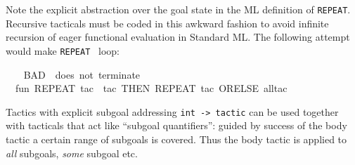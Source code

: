 \begin{isabellebody}
\begin{isamarkuptext}
  \begin{warn}
  Note the explicit abstraction over the goal state in the ML
  definition of \verb|REPEAT|.  Recursive tacticals must be coded in
  this awkward fashion to avoid infinite recursion of eager functional
  evaluation in Standard ML.  The following attempt would make \verb|REPEAT|~ loop:
  \end{warn}%
\end{isamarkuptext}%
\isamarkuptrue%
%
\isadelimML
%
\endisadelimML
%
\isatagML
{}\isamarkupfalse%
\ {}\isanewline
\ \ {}{}BAD\ {}{}\ does\ not\ terminate{}{}{}\isanewline
\ \ fun\ REPEAT\ tac\ {}\ {}tac\ THEN\ REPEAT\ tac{}\ ORELSE\ all{}tac{}\isanewline
{}%
\endisatagML
{\isafoldML}%
%
\isadelimML
%
\endisadelimML
%
\isamarkuptrue%
%
\begin{isamarkuptext}%
Tactics with explicit subgoal addressing
  \verb|int -> tactic| can be used together with tacticals that
  act like ``subgoal quantifiers'': guided by success of the body
  tactic a certain range of subgoals is covered.  Thus the body tactic
  is applied to \emph{all} subgoals, \emph{some} subgoal etc.


\end{isamarkuptext}
\end{isabellebody}
